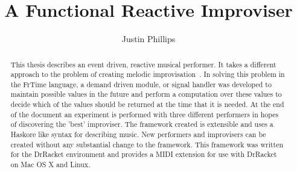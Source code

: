 \documentclass[12pt]{ucthesis}
\begin{document}

\title{A Functional Reactive Improviser}
\author{Justin Phillips}
  
 
     



\maketitle

\begin{frontmatter}

\copyrightpage

\committeemembershippage

\begin{abstract}

This thesis describes an event driven, reactive musical performer. It takes a different approach to the problem of creating melodic improvisation~\cite{bob}. In solving this problem in the FrTime language, a demand driven module, or signal handler was developed to maintain possible values in the future and perform a computation over these values to decide which of the values should be  returned at the time that it is needed. At the end of the document an experiment is performed with three different performers in hopes of discovering the 'best' improviser. The framework created is extensible and uses a Haskore like syntax for describing music. New performers and improvisers can be created without any substantial change to the framework. This framework was written for the DrRacket environment and provides a MIDI extension for use with DrRacket on Mac OS X and Linux. 

\end{abstract}





\tableofcontents


\listoftables

\listoffigures

\end{frontmatter}
\end{document}
